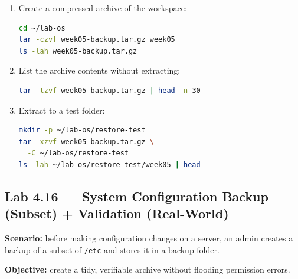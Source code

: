 \begin{enumerate}
    \item Create a compressed archive of the workspace:
\begin{lstlisting}[language=bash, caption={Creating a tar.gz}]
cd ~/lab-os
tar -czvf week05-backup.tar.gz week05
ls -lah week05-backup.tar.gz
\end{lstlisting}

    \item List the archive contents without extracting:
\begin{lstlisting}[language=bash, caption={Listing tar.gz contents}]
tar -tzvf week05-backup.tar.gz | head -n 30
\end{lstlisting}

    \item Extract to a test folder:
\begin{lstlisting}[language=bash, caption={Extracting tar.gz to a specific folder}]
mkdir -p ~/lab-os/restore-test
tar -xzvf week05-backup.tar.gz \
  -C ~/lab-os/restore-test
ls -lah ~/lab-os/restore-test/week05 | head
\end{lstlisting}
\end{enumerate}

\subsection*{Lab 4.16 --- System Configuration Backup (Subset) + Validation (Real-World)}
\textbf{Scenario:} before making configuration changes on a server, an admin
creates a backup of a subset of \texttt{/etc} and stores it in a backup folder.

\textbf{Objective:} create a tidy, verifiable archive without flooding
permission errors.

